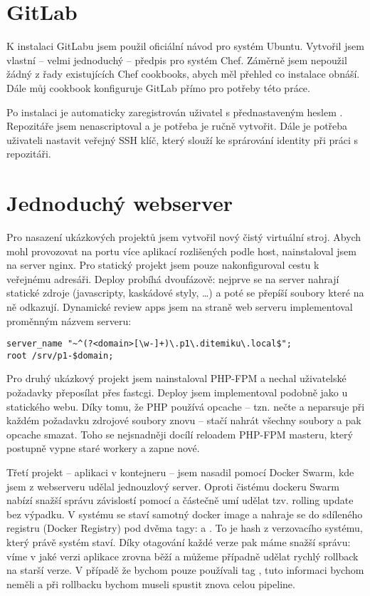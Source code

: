 
\section{GitLab}
    K instalaci GitLabu jsem použil oficiální návod pro systém Ubuntu. Vytvořil jsem vlastní -- velmi jednoduchý -- předpis pro systém Chef. Záměrně jsem nepoužil žádný z řady existujících Chef cookbooks, abych měl přehled co instalace obnáší. Dále můj cookbook konfiguruje GitLab přímo pro potřeby této práce.

    Po instalaci je automaticky zaregistrován uživatel  s přednastaveným heslem . Repozitáře jsem nenascriptoval a je potřeba je ručně vytvořit. Dále je potřeba uživateli nastavit veřejný SSH klíč, který slouží ke sprárování identity při práci s repozitáři.

\section{Jednoduchý webserver}
    Pro nasazení ukázkových projektů jsem vytvořil nový čistý virtuální stroj. Abych mohl provozovat na \HTTP portu více aplikací rozlišených podle host, nainstaloval jsem na server nginx. Pro statický projekt jsem pouze nakonfiguroval cestu k veřejnému adresáři. Deploy probíhá dvoufázově: nejprve se na server nahrají statické zdroje (javascripty, kaskádové styly, \ldots) a poté se přepíší  soubory které na ně odkazují. Dynamické review apps jsem na straně web serveru implementoval proměnným názvem serveru:

        \begin{verbatim}
server_name "~^(?<domain>[\w-]+)\.p1\.ditemiku\.local$";
root /srv/p1-$domain;
        \end{verbatim}

    Pro druhý ukázkový projekt jsem nainstaloval PHP-FPM a nechal uživatelské požadavky přeposílat přes fastcgi. Deploy jsem implementoval podobně jako u statického webu. Díky tomu, že PHP používá opcache -- tzn. nečte a neparsuje při každém požadavku zdrojové soubory znovu -- stačí nahrát všechny soubory a pak opcache smazat. Toho se nejsnadněji docílí reloadem PHP-FPM masteru, který postupně vypne staré workery a zapne nové.

    Třetí projekt -- aplikaci v kontejneru -- jsem nasadil pomocí Docker Swarm, kde jsem z webserveru udělal jednouzlový server. Oproti čistému dockeru Swarm nabízí snažší správu závislostí pomocí  a částečně umí udělat tzv. rolling update bez výpadku. V \CI systému se staví samotný docker image a nahraje se do sdíleného registru (Docker Registry) pod dvěma tagy:  a . To je hash z verzovacího systému, který právě \CI systém staví. Díky otagování každé verze pak máme snažší správu: víme v jaké verzi aplikace zrovna běží a můžeme případně udělat rychlý rollback na starší verze. V případě že bychom pouze používali tag , tuto informaci bychom neměli a při rollbacku bychom museli spustit znova celou \CI pipeline.
